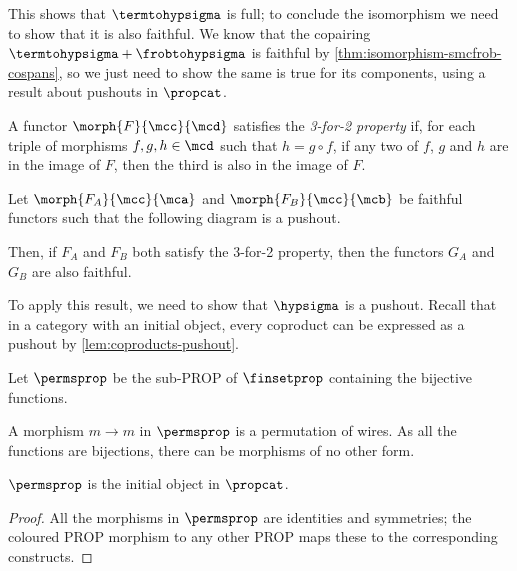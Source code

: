 This shows that \(\termtohypsigma\) is full; to conclude the isomorphism we
need to show that it is also faithful.
We know that the copairing \(\termtohypsigma + \frobtohypsigma\) is faithful
by \cref{thm:isomorphism-smcfrob-cospans}, so we just need to show the same is
true for its components, using a result about pushouts in \(\propcat\).

\begin{definition}
    A functor \(\morph{F}{\mcc}{\mcd}\) satisfies the \emph{3-for-2 property}
    if, for each triple of morphisms \(f,g,h \in \mcd\) such that
    \(h = g \circ f\), if any two of \(f\), \(g\) and \(h\) are in the image of
    \(F\), then the third is also in the image of \(F\).
\end{definition}

\begin{theorem}
    \label{thm:faithful-pushout}
    Let \(\morph{F_A}{\mcc}{\mca}\) and \(\morph{F_B}{\mcc}{\mcb}\) be faithful
    functors such that the following diagram is a pushout.
    \begin{center}
        
    \end{center}
    Then, if \(F_A\) and \(F_B\) both satisfy the 3-for-2 property, then the
    functors \(G_A\) and \(G_B\) are also faithful.
\end{theorem}

To apply this result, we need to show that \(\hypsigma\) is a pushout.
Recall that in a category with an initial object, every coproduct can be
expressed as a pushout by \cref{lem:coproducts-pushout}.

\begin{definition}
    Let \(\permsprop\) be the sub-PROP of \(\finsetprop\)
    containing the bijective functions.
\end{definition}

A morphism \(m \to m\) in \(\permsprop\) is a
permutation of wires.
As all the functions are bijections, there can be morphisms of no other form.

\begin{lemma}\label{lem:perms-initial}
    \(\permsprop\) is the initial object in \(\propcat\).
\end{lemma}
\begin{proof}
    All the morphisms in \(\permsprop\) are identities and symmetries; the
    coloured PROP morphism to any other PROP maps these to the corresponding
    constructs.
\end{proof}

